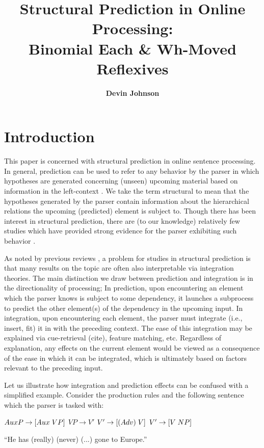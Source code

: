 \documentclass[12pt]{article}
\title{{\normalsize\bfseries {Structural Prediction in Online Processing: \\ \small{Binomial Each \& Wh-Moved Reflexives}}}}
\author{\normalsize\bfseries {Devin Johnson}}
\date{}
\begin{document}
\maketitle

\section{Introduction}
This paper is concerned with structural prediction in online sentence processing. In general, prediction
can be used to refer to any behavior by the parser in which hypotheses are generated concerning
(unseen) upcoming material based on information in the left-context \cite{Crocker2002,Kazanina2017}.
We take the term structural to mean that the hypotheses generated by the parser contain information
about the hierarchical relations the upcoming (predicted) element is subject to. Though there has been interest in structural prediction, there are (to our knowledge) relatively few studies which have provided strong evidence for the parser exhibiting such behavior \cite{Yoshida-Dickey-Sturt2013,Staub-Clifton2006, Kazanina2017, Phillips2006}.

As noted by previous reviews \cite{Kutas-DeLong-Smith2011,Kamide2008}, a problem for studies in structural prediction is that many results on the topic are often also interpretable via integration \cite{Kutas-Hillyard1980} theories.
The main distinction we draw between prediction and integration is in the directionality of processing; In prediction, upon encountering an element which the parser knows is subject to some dependency, it launches a subprocess to predict the other element(s) of the dependency in the upcoming input. In integration, upon encountering each element, the parser must integrate (i.e., insert, fit) it in with the preceding context. The ease of this integration may be explained via cue-retrieval (cite), feature matching, etc. Regardless of explanation, any effects on the current element would be viewed as a consequence of the ease in which it can be integrated, which is ultimately based on factors relevant to the preceding input. 

Let us illustrate how integration and prediction effects can be confused with a simplified example. Consider the production rules and the following sentence which the parser is tasked with:
\begin{exe}
    \ex
    \begin{xlist}
        \ex $AuxP \rightarrow [Aux \hspace{0.1cm} VP]$
        \ex $VP \rightarrow V'$
        \ex $ V' \rightarrow  [(Adv) \hspace{0.1cm} V]$
        \ex $V'\rightarrow [V \hspace{0.1cm} NP]$
    \end{xlist}
\end{exe}
``He has (really) (never) (...) gone to Europe.''\\
\end{document}
